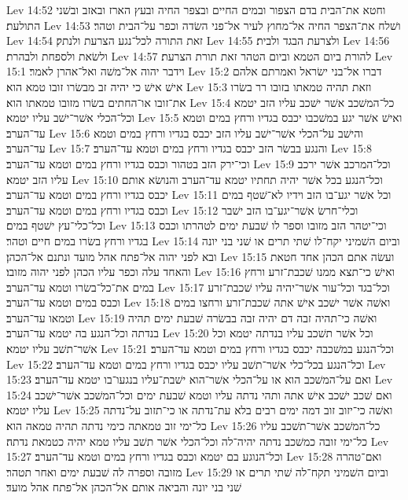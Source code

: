 Lev 14:52  וחטא את־הבית בדם הצפור ובמים החיים ובצפר החיה ובעץ הארז ובאזב ובשׁני התולעת׃
Lev 14:53  ושׁלח את־הצפר החיה אל־מחוץ לעיר אל־פני השׂדה וכפר על־הבית וטהר׃
Lev 14:54  זאת התורה לכל־נגע הצרעת ולנתק׃
Lev 14:55  ולצרעת הבגד ולבית׃
Lev 14:56  ולשׂאת ולספחת ולבהרת׃
Lev 14:57  להורת ביום הטמא וביום הטהר זאת תורת הצרעת׃
Lev 15:1  וידבר יהוה אל־משׁה ואל־אהרן לאמר׃
Lev 15:2  דברו אל־בני ישׂראל ואמרתם אלהם אישׁ אישׁ כי יהיה זב מבשׂרו זובו טמא הוא׃
Lev 15:3  וזאת תהיה טמאתו בזובו רר בשׂרו את־זובו או־החתים בשׂרו מזובו טמאתו הוא׃
Lev 15:4  כל־המשׁכב אשׁר ישׁכב עליו הזב יטמא וכל־הכלי אשׁר־ישׁב עליו יטמא׃
Lev 15:5  ואישׁ אשׁר יגע במשׁכבו יכבס בגדיו ורחץ במים וטמא עד־הערב׃
Lev 15:6  והישׁב על־הכלי אשׁר־ישׁב עליו הזב יכבס בגדיו ורחץ במים וטמא עד־הערב׃
Lev 15:7  והנגע בבשׂר הזב יכבס בגדיו ורחץ במים וטמא עד־הערב׃
Lev 15:8  וכי־ירק הזב בטהור וכבס בגדיו ורחץ במים וטמא עד־הערב׃
Lev 15:9  וכל־המרכב אשׁר ירכב עליו הזב יטמא׃
Lev 15:10  וכל־הנגע בכל אשׁר יהיה תחתיו יטמא עד־הערב והנושׂא אותם יכבס בגדיו ורחץ במים וטמא עד־הערב׃
Lev 15:11  וכל אשׁר יגע־בו הזב וידיו לא־שׁטף במים וכבס בגדיו ורחץ במים וטמא עד־הערב׃
Lev 15:12  וכלי־חרשׂ אשׁר־יגע־בו הזב ישׁבר וכל־כלי־עץ ישׁטף במים׃
Lev 15:13  וכי־יטהר הזב מזובו וספר לו שׁבעת ימים לטהרתו וכבס בגדיו ורחץ בשׂרו במים חיים וטהר׃
Lev 15:14  וביום השׁמיני יקח־לו שׁתי תרים או שׁני בני יונה ובא לפני יהוה אל־פתח אהל מועד ונתנם אל־הכהן׃
Lev 15:15  ועשׂה אתם הכהן אחד חטאת והאחד עלה וכפר עליו הכהן לפני יהוה מזובו׃
Lev 15:16  ואישׁ כי־תצא ממנו שׁכבת־זרע ורחץ במים את־כל־בשׂרו וטמא עד־הערב׃
Lev 15:17  וכל־בגד וכל־עור אשׁר־יהיה עליו שׁכבת־זרע וכבס במים וטמא עד־הערב׃
Lev 15:18  ואשׁה אשׁר ישׁכב אישׁ אתה שׁכבת־זרע ורחצו במים וטמאו עד־הערב׃
Lev 15:19  ואשׁה כי־תהיה זבה דם יהיה זבה בבשׂרה שׁבעת ימים תהיה בנדתה וכל־הנגע בה יטמא עד־הערב׃
Lev 15:20  וכל אשׁר תשׁכב עליו בנדתה יטמא וכל אשׁר־תשׁב עליו יטמא׃
Lev 15:21  וכל־הנגע במשׁכבה יכבס בגדיו ורחץ במים וטמא עד־הערב׃
Lev 15:22  וכל־הנגע בכל־כלי אשׁר־תשׁב עליו יכבס בגדיו ורחץ במים וטמא עד־הערב׃
Lev 15:23  ואם על־המשׁכב הוא או על־הכלי אשׁר־הוא ישׁבת־עליו בנגעו־בו יטמא עד־הערב׃
Lev 15:24  ואם שׁכב ישׁכב אישׁ אתה ותהי נדתה עליו וטמא שׁבעת ימים וכל־המשׁכב אשׁר־ישׁכב עליו יטמא׃
Lev 15:25  ואשׁה כי־יזוב זוב דמה ימים רבים בלא עת־נדתה או כי־תזוב על־נדתה כל־ימי זוב טמאתה כימי נדתה תהיה טמאה הוא׃
Lev 15:26  כל־המשׁכב אשׁר־תשׁכב עליו כל־ימי זובה כמשׁכב נדתה יהיה־לה וכל־הכלי אשׁר תשׁב עליו טמא יהיה כטמאת נדתה׃
Lev 15:27  וכל־הנוגע בם יטמא וכבס בגדיו ורחץ במים וטמא עד־הערב׃
Lev 15:28  ואם־טהרה מזובה וספרה לה שׁבעת ימים ואחר תטהר׃
Lev 15:29  וביום השׁמיני תקח־לה שׁתי תרים או שׁני בני יונה והביאה אותם אל־הכהן אל־פתח אהל מועד׃
